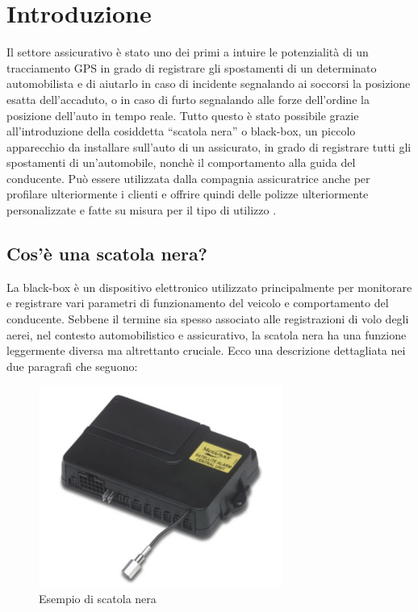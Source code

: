 \documentclass[12pt, a4paper, italian]{report}
\numberwithin{figure}{chapter}
\numberwithin{table}{chapter}
\begin{document}
\chapter{Introduzione}
Il settore assicurativo è stato uno dei primi a intuire le potenzialità di un tracciamento GPS in grado di registrare gli spostamenti di un determinato automobilista
e di aiutarlo in caso di incidente segnalando ai soccorsi la posizione esatta dell’accaduto, o in caso di furto segnalando alle forze dell’ordine la posizione dell’auto in
tempo reale. Tutto questo è stato possibile grazie all’introduzione della cosiddetta
“scatola nera” o black-box, un piccolo apparecchio da installare sull’auto di un
assicurato, in grado di registrare tutti gli spostamenti di un’automobile, nonchè il
comportamento alla guida del conducente. Può essere utilizzata dalla compagnia
assicuratrice anche per profilare ulteriormente i clienti e offrire quindi delle polizze
ulteriormente personalizzate e fatte su misura per il tipo di utilizzo
\cite{fracassi2012}.
\section{Cos'è una scatola nera?}
La black-box è un dispositivo elettronico utilizzato principalmente per monitorare e registrare vari parametri di funzionamento del veicolo e comportamento del conducente. Sebbene il termine sia spesso associato alle registrazioni di volo degli aerei, nel contesto automobilistico e assicurativo, la scatola nera ha una funzione leggermente diversa ma altrettanto cruciale. Ecco una descrizione dettagliata nei due paragrafi che seguono:

\begin{figure}[h] \centering
\includegraphics[width=8cm]{esempioScatolaNera.png}
\caption{Esempio di scatola nera\protect\footnotemark}
\label{fig:scatolaNera}
\end{figure}
\end{document}
